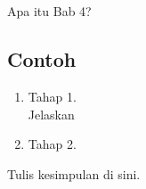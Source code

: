 \chapter{\babEmpat}
Apa itu Bab 4?


\section{Contoh}
\begin{enumerate}
	\item Tahap 1. \\ %
	Jelaskan %

	\item Tahap 2.
\end{enumerate}

Tulis kesimpulan di sini.
